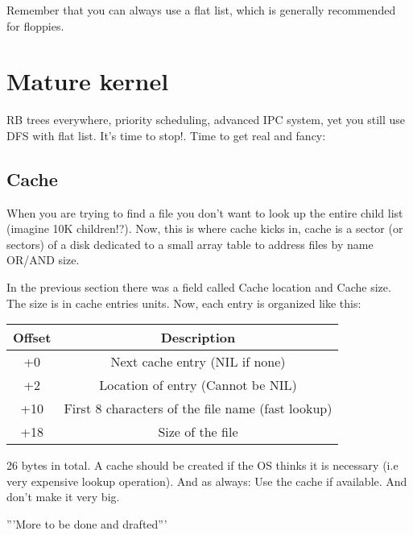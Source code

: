 \documentclass[12pt]{article}
\begin{document}
Remember that you can always use a flat list, which is generally recommended for floppies.

\section{Mature kernel}

RB trees everywhere, priority scheduling, advanced IPC system, yet you still use DFS with flat list. It's time to stop!. Time to get real and fancy:

\subsection{Cache}
When you are trying to find a file you don't want to look up the entire child list (imagine 10K children!?). Now, this is where cache kicks in, cache is a sector (or sectors) of a disk dedicated to a small array table to address files by name OR/AND size.

In the previous section there was a field called Cache location and Cache size. The size is in cache entries units. Now, each entry is organized like this:

\begin{center}
\begin{tabular}{ |c|c| }
\hline
Offset & Description \\
\hline
+0 & Next cache entry (NIL if none) \\
+2 & Location of entry (Cannot be NIL) \\
+10 & First 8 characters of the file name (fast lookup) \\
+18 & Size of the file \\
\hline
\end{tabular}
\end{center}

26 bytes in total. A cache should be created if the OS thinks it is necessary (i.e very expensive lookup operation). And as always: Use the cache if available. And don't make it very big.

'''More to be done and drafted'''
\end{document}
